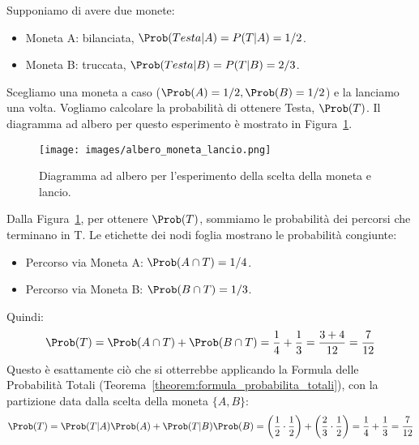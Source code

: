 \begin{example}
Supponiamo di avere due monete:
\begin{itemize}
    \item Moneta A: bilanciata, $\Prob(Testa|A) = P(T|A) = 1/2$.
    \item Moneta B: truccata, $\Prob(Testa|B) = P(T|B) = 2/3$.
\end{itemize}
Scegliamo una moneta a caso ($\Prob(A) = 1/2, \Prob(B) = 1/2$) e la lanciamo una volta. Vogliamo calcolare la probabilità di ottenere Testa, $\Prob(T)$. Il diagramma ad albero per questo esperimento è mostrato in Figura~\ref{fig:albero_moneta_lancio}.

\begin{figure}[H] %
    \centering
    \texttt{[image: images/albero\_moneta\_lancio.png]}
    \caption{Diagramma ad albero per l'esperimento della scelta della moneta e lancio.}
    \label{fig:albero_moneta_lancio}
\end{figure}

Dalla Figura~\ref{fig:albero_moneta_lancio}, per ottenere $\Prob(T)$, sommiamo le probabilità dei percorsi che terminano in T. Le etichette dei nodi foglia mostrano le probabilità congiunte:
\begin{itemize}
    \item Percorso via Moneta A: $\Prob(A \cap T) = 1/4$.
    \item Percorso via Moneta B: $\Prob(B \cap T) = 1/3$.
\end{itemize}
Quindi:
\[ \Prob(T) = \Prob(A \cap T) + \Prob(B \cap T) = \frac{1}{4} + \frac{1}{3} = \frac{3+4}{12} = \frac{7}{12} \]
Questo è esattamente ciò che si otterrebbe applicando la Formula delle Probabilità Totali (Teorema~\ref{theorem:formula_probabilita_totali}), con la partizione data dalla scelta della moneta $\{A, B\}$:
\[ \Prob(T) = \Prob(T|A)\Prob(A) + \Prob(T|B)\Prob(B) = \left(\frac{1}{2} \cdot \frac{1}{2}\right) + \left(\frac{2}{3} \cdot \frac{1}{2}\right) = \frac{1}{4} + \frac{1}{3} = \frac{7}{12} \]
\end{example}


